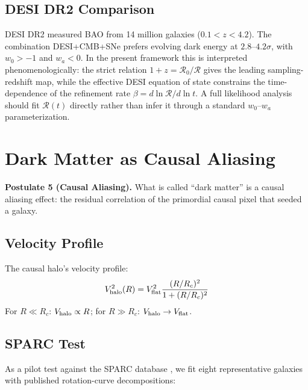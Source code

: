 \documentclass[12pt]{article}
\begin{document}
\subsection{DESI DR2 Comparison}
DESI DR2 \citep{desi2025} measured BAO from 14 million galaxies ($0.1<z<4.2$). The combination DESI+CMB+SNe prefers evolving dark energy at $2.8$--$4.2\sigma$, with $w_0 > -1$ and $w_a < 0$. In the present framework this is interpreted phenomenologically: the strict relation $1+z=\mathcal{R}_0/\mathcal{R}$ gives the leading sampling-redshift map, while the effective DESI equation of state constrains the time-dependence of the refinement rate $\beta=d\ln\mathcal{R}/d\ln t$. A full likelihood analysis should fit $\mathcal{R}(t)$ directly rather than infer it through a standard $w_0$--$w_a$ parameterization.

\section{Dark Matter as Causal Aliasing}
\label{sec:dm}

{\bf Postulate 5 (Causal Aliasing).} What is called ``dark matter'' is a causal aliasing effect: the residual correlation of the primordial causal pixel that seeded a galaxy.

\subsection{Velocity Profile}
The causal halo's velocity profile:
\begin{equation}
V_{\rm halo}^2(R) = V_{\rm flat}^2 \frac{(R/R_c)^2}{1 + (R/R_c)^2}
\label{eq:causal-halo}
\end{equation}
For $R \ll R_c$: $V_{\rm halo} \propto R$; for $R \gg R_c$: $V_{\rm halo} \to V_{\rm flat}$.

\subsection{SPARC Test}
As a pilot test against the SPARC database \citep{lelli2016}, we fit eight representative galaxies with published rotation-curve decompositions:
\end{document}
